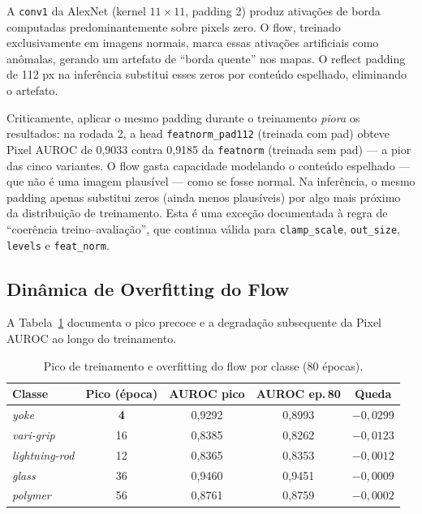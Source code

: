 \documentclass[conference]{IEEEtran}
\begin{document}
A \texttt{conv1} da AlexNet (kernel $11 \times 11$, padding 2) produz ativações de borda computadas predominantemente sobre pixels zero. O flow, treinado exclusivamente em imagens normais, marca essas ativações artificiais como anômalas, gerando um artefato de ``borda quente'' nos mapas. O reflect padding de 112 px na inferência substitui esses zeros por conteúdo espelhado, eliminando o artefato.

Criticamente, aplicar o mesmo padding durante o treinamento \textit{piora} os resultados: na rodada 2, a head \texttt{featnorm\_pad112} (treinada com pad) obteve Pixel AUROC de 0{,}9033 contra 0{,}9185 da \texttt{featnorm} (treinada sem pad) --- a pior das cinco variantes. O flow gasta capacidade modelando o conteúdo espelhado --- que não é uma imagem plausível --- como se fosse normal. Na inferência, o mesmo padding apenas substitui zeros (ainda menos plausíveis) por algo mais próximo da distribuição de treinamento. Esta é uma exceção documentada à regra de ``coerência treino--avaliação'', que continua válida para \texttt{clamp\_scale}, \texttt{out\_size}, \texttt{levels} e \texttt{feat\_norm}.

\subsection{Dinâmica de Overfitting do Flow}
\label{sec:overfitting}

A Tabela~\ref{tab:overfitting} documenta o pico precoce e a degradação subsequente da Pixel AUROC ao longo do treinamento.

\begin{table}[htb]
\centering
\caption{Pico de treinamento e overfitting do flow por classe (80 épocas).}
\label{tab:overfitting}
\begin{tabular}{@{}lcccc@{}}
\toprule
Classe & Pico (época) & AUROC pico & AUROC ep.\,80 & Queda \\
\midrule
\textit{yoke}      & \textbf{4}  & 0,9292 & 0,8993 & $-0{,}0299$ \\
\textit{vari-grip}  & 16 & 0,8385 & 0,8262 & $-0{,}0123$ \\
\textit{lightning-rod} & 12 & 0,8365 & 0,8353 & $-0{,}0012$ \\
\textit{glass}      & 36 & 0,9460 & 0,9451 & $-0{,}0009$ \\
\textit{polymer}    & 56 & 0,8761 & 0,8759 & $-0{,}0002$ \\
\bottomrule
\end{tabular}
\end{table}
\end{document}
